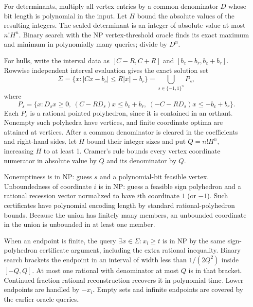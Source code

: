 For determinants, multiply all vertex entries by a common denominator $D$ whose bit length is polynomial in the input. Let $H$ bound the absolute values of the resulting integers. The scaled determinant is an integer of absolute value at most $n!H^n$. Binary search with the NP vertex-threshold oracle finds its exact maximum and minimum in polynomially many queries; divide by $D^n$.

For hulls, write the interval data as $[C-R,C+R]$ and $[b_c-b_r,b_c+b_r]$. Rowwise independent interval evaluation gives the exact solution set
\[
 \Sigma=\{x:|Cx-b_c|\le R|x|+b_r\}
       =\bigcup_{s\in\{-1,1\}^n}P_s,
\]
where
\[
 P_s=\{x:D_sx\ge0,\ (C-RD_s)x\le b_c+b_r,
                 \ (-C-RD_s)x\le-b_c+b_r\}.
\]
Each $P_s$ is a rational pointed polyhedron, since it is contained in an orthant. Nonempty such polyhedra have vertices, and finite coordinate optima are attained at vertices. After a common denominator is cleared in the coefficients and right-hand sides, let $H$ bound their integer sizes and put $Q=n!H^n$, increasing $H$ to at least 1. Cramer's rule bounds every vertex coordinate numerator in absolute value by $Q$ and its denominator by $Q$.

Nonemptiness is in NP: guess $s$ and a polynomial-bit feasible vertex. Unboundedness of coordinate $i$ is in NP: guess a feasible sign polyhedron and a rational recession vector normalized to have $i$th coordinate $1$ (or $-1$). Such certificates have polynomial encoding length by standard rational-polyhedron bounds. Because the union has finitely many members, an unbounded coordinate in the union is unbounded in at least one member.

When an endpoint is finite, the query $\exists x\in\Sigma:x_i\ge t$ is in NP by the same sign-polyhedron certificate argument, including the extra rational inequality. Binary search brackets the endpoint in an interval of width less than $1/(2Q^2)$ inside $[-Q,Q]$. At most one rational with denominator at most $Q$ is in that bracket. Continued-fraction rational reconstruction recovers it in polynomial time. Lower endpoints are handled by $-x_i$. Empty sets and infinite endpoints are covered by the earlier oracle queries.

